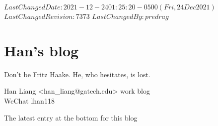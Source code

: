 {$LastChangedDate: 2021-12-24 01:25:20 -0500 (Fri, 24 Dec 2021) $}
{$LastChangedRevision: 7373 $} {$LastChangedBy: predrag $}

\chapter{Han's blog}
\label{chap:blogHL}
\renewcommand{\Ssym}[1]{{\ensuremath{m_{#1}}}}    %
\renewcommand{\Refl}{\ensuremath{{\sigma}}} %
\renewcommand{\shift}{\ensuremath{r}}
\renewcommand{\ssp}{\ensuremath{\phi}}             %

Don't be
{Fritz Haake}. He, who hesitates, is lost.

\bigskip

\hfill   {\large Han Liang <han\_liang@gatech.edu> work blog}\\
\hfill   WeChat  lhan118

\hfill   {\color{red} The latest entry at the bottom for this blog}

\bigskip

